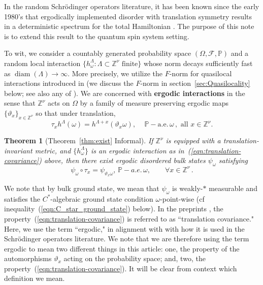 \documentclass{article}
\newcommand{\Znu}{\mathbb{Z}^\nu}
\DeclareMathOperator{\diam}{diam}
\renewcommand{\P}{\mathbb{P}}
\newcommand{\<}{\langle}
\renewcommand{\>}{\rangle}
\newtheorem{thmx}{Theorem}
\theoremstyle{definition}
\numberwithin{equation}{section}
\begin{document}
In the random Schr\"odinger operators literature, it has been known since the early 1980's that ergodically implemented disorder with translation symmetry results in a deterministic spectrum for the total Hamiltonian \cite{KirschMartinelli, Lentz_et_al, Pastur75}. The purpose of this note is to extend this result to the quantum spin system setting. 

To wit, we consider a countably generated probability space $(\Omega, \mathcal{F}, \P)$ and a random local interaction $\{h^{\Lambda}_\omega \colon \Lambda \subset \Znu \text{ finite}\}$ whose norm decays sufficiently fast as $\diam(\Lambda) \to \infty$. More precisely, we utilize the $F$-norm for quasilocal interactions introduced in \cite{NachtergaeleOgataSims} (we discuss the $F$-norm in section~\ref{sec:Quasilocality} below; see also any of \cite{NachtergaeleSimsYoung, NachtergaeleSimsYoung_2, NachtergaeleSimsYoung_bulk}). We are concerned with \textbf{ergodic interactions} in the sense that $\Znu$ acts on $\Omega$ by a family of measure preserving ergodic maps $\{\vartheta_x\}_{x\in \Znu}$ so that under translation,
\begin{equation}\label{eqn:translation-covariance}
    \tau_{x} h^{\Lambda}(\omega) = h^{\Lambda +x}(\vartheta_x \omega),\,\quad \P-\text{a.e.}\, \omega\,, \text{ all }x\in \Znu.
\end{equation}
\begin{thmx}[Theorem~\ref{thm:exist} Informal]\label{thmx:exist}
	If $\Znu$ is equipped with a translation-invariant metric, and  $\{h^{\Lambda}_\omega\}$ is an ergodic interaction as in~(\ref{eqn:translation-covariance}) above, then there exist ergodic disordered bulk states $\psi_\omega$ satisfying
\begin{equation}
    \psi_\omega \circ \tau_x = \psi_{\vartheta_x \omega},\, \P-a.e.\, \omega, \qquad\forall x \in \Znu\,.
\end{equation}
\end{thmx} We note that by bulk ground state, we mean that $\psi_\omega$ is weakly-$\ast$ measurable and satisfies the $C^*$-algebraic ground state condition $\omega$-point-wise (cf inequality~(\ref{eqn:C_star_ground_state}) below). In the preprints \cite{EkbladMoreno-NadalesRoonSchenker, RoonSchenker}, the property~(\ref{eqn:translation-covariance}) is referred to as ``translation covariance." Here, we use the term ``ergodic," in alignment with with how it is used in the Schr\"odinger operators literature. We note that we are therefore using the term ergodic to mean two different things in this article: one, the property of the automorphisms $\vartheta_x$ acting on the probability space; and, two, the property~(\ref{eqn:translation-covariance}). It will be clear from context which definition we mean. 
\end{document}
